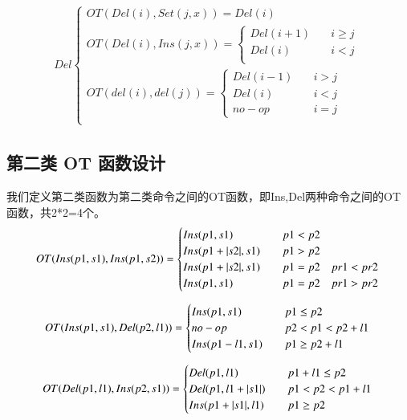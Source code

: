 \begin{equation}
\begin{aligned}
Del \begin{cases}
OT(Del (i), Set (j,x)) =
	{Del(i)}\\
OT(Del (i), Ins (j,x)) =\begin{cases}
	{Del (i+1)}  \quad &i \ge j\\
	{Del (i)}   \quad &i < j\\ \end{cases}\\
OT(del (i), del (j)) =\begin{cases}
	{Del (i-1)} \quad &i > j\\
	{Del (i)} \quad &i < j\\
	{no-op}   \quad &i = j \end{cases}\\
\end{cases}
\end{aligned}
\end{equation}

\subsection{第二类 OT 函数设计}
我们定义第二类函数为第二类命令之间的OT函数，即Ins,Del两种命令之间的OT函数，共2*2=4个。
\begin{equation}
OT(Ins(p1,s1),Ins(p1,s2))= \begin{cases}
Ins(p1,s1) \quad & p1<p2 \\
Ins(p1+ |s2|,s1) \quad & p1>p2 \\
Ins(p1+ |s2|,s1) \quad & p1=p2 \quad pr1<pr2 \\
Ins(p1,s1) \quad & p1=p2 \quad pr1>pr2
 \end{cases}\\
\end{equation}

\begin{equation}
OT(Ins(p1,s1),Del(p2,l1))= \begin{cases}
Ins(p1,s1) \quad & p1 \le p2 \\
no-op \quad & p2<p1<p2+l1\\
Ins(p1-l1,s1) \quad & p1 \ge p2+l1 \end{cases}\\
\end{equation}

\begin{equation}
OT(Del(p1,l1),Ins(p2,s1))= \begin{cases}
Del(p1,l1) \quad & p1 + l1 \le p2 \\
Del(p1,l1+|s1|) \quad & p1<p2<p1+l1 \\
Ins(p1+ |s1|,l1) \quad & p1 \ge p2 \end{cases}\\
\end{equation}

